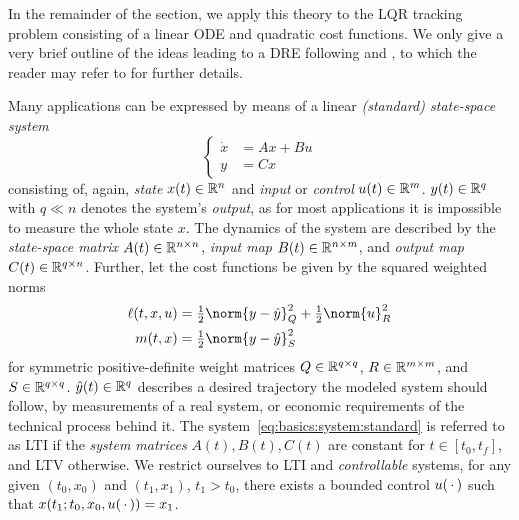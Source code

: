 In the remainder of the section,
we apply this theory to the \ac{LQR} tracking problem
consisting of a linear \ac{ODE} and quadratic cost functions.
We only give a very brief outline of the ideas leading to a \ac{DRE}
following \cite[Remarks~3.3 and~3.6]{Locatelli2011} and \cite[Section~3.2.2]{Lang2017},
to which the reader may refer to for further details.

Many applications can be expressed by means of a
linear \emph{(standard) state-space system}
\begin{equation}
\label{eq:basics:system:standard}
\left\{
\begin{aligned}
  \dot x &= Ax + Bu \\
  y &= Cx
\end{aligned}
\right.
\end{equation}
consisting of, again, \emph{state} $x(t)\in\mathbb{R}^n$ and \emph{input} or \emph{control} $u(t)\in\mathbb{R}^m$.
$y(t) \in\mathbb{R}^q$ with $q \ll n$ denotes the system's \emph{output},
as for most applications it is impossible to measure the whole state $x$.
The dynamics of the system are described by the
\emph{state-space matrix} $A(t) \in \mathbb{R}^{n\times n}$,
\emph{input map} $B(t) \in\mathbb{R}^{n \times m}$,
and
\emph{output map} $C(t) \in\mathbb{R}^{q\times n}$.
Further, let the cost functions be given by the squared weighted norms
\begin{equation}
\label{eq:basics:LQR:cost}
\begin{aligned}
  \ell(t, x, u)
  &= \tfrac{1}{2}\norm{y - \hat y}_Q^2 + \tfrac{1}{2}\norm{u}_R^2 \\
  m(t, x)
  &= \tfrac{1}{2} \norm{y - \hat y}_S^2
\end{aligned}
\end{equation}
for symmetric positive-definite weight matrices
$Q\in\mathbb{R}^{q\times q}$,
$R\in\mathbb{R}^{m\times m}$, and
$S\in\mathbb{R}^{q\times q}$.
$\hat y(t) \in\mathbb{R}^q$ describes a desired trajectory the modeled system should follow,
\eg by measurements of a real system, or economic requirements of the technical process behind it.
The system~\eqref{eq:basics:system:standard} is referred to as \ac{LTI}
if the \emph{system matrices} $A(t), B(t), C(t)$ are constant for $t\in [t_0,t_f]$,
and \ac{LTV} otherwise.
We restrict ourselves to \ac{LTI} and \emph{controllable} systems,
\ie for any given $(t_0, x_0)$ and $(t_1, x_1)$, $t_1 > t_0$,
there exists a bounded control $u(\optional{})$ such that $x(t_1; t_0, x_0, u(\optional{})) = x_1$.

